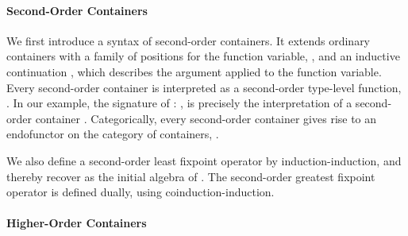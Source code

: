 \documentclass{article}
\begin{document}
\paragraph{Second-Order Containers}

We first introduce a syntax  of second-order containers. It extends ordinary containers with a family of positions for the function variable, \;\AgdaSymbol{:}\;\;\;, and an inductive continuation \mbox{\;\AgdaSymbol{:}\;\AgdaSymbol{(}\;\AgdaSymbol{:}\;\AgdaSymbol{)}\;\;\;\;\;}, which describes the argument applied to the function variable. Every second-order container is interpreted as a second-order type-level function, \;\AgdaSymbol{:}\;\;\;\AgdaSymbol{(}\;\;\AgdaSymbol{)}\;\;\;\;. In our example, the signature of : \;\;\;\AgdaSymbol{=}\;\;\;\;\;\;\AgdaSymbol{(}\;\AgdaSymbol{)}, is precisely the interpretation of a second-order container \;\AgdaSymbol{:}\;. Categorically, every second-order container  gives rise to an endofunctor on the category of containers, \;\;\AgdaSymbol{:}\;\;\;.

We also define a second-order least fixpoint operator \;\AgdaSymbol{:}\;\;\; by induction-induction, and thereby recover  as the initial algebra of \;. The second-order greatest fixpoint operator \;\AgdaSymbol{:}\;\;\; is defined dually, using coinduction-induction.

\paragraph{Higher-Order Containers}
\end{document}
